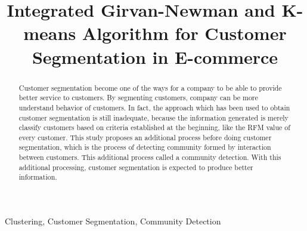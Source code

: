 \documentclass[conference]{IEEEtran}
\begin{document}
%
\title{Integrated Girvan-Newman and K-means Algorithm for Customer Segmentation in E-commerce}


\author{
\and
{}
}

\maketitle


\begin{abstract}
Customer segmentation become one of  the ways for a company to be able to provide better service to customers. By segmenting customers, company can be more understand behavior of customers. In fact, the approach which has been used to obtain customer segmentation is still inadequate, because the information generated is merely classify customers based on criteria established at the beginning, like the RFM value of every customer. This study proposes an additional process before doing customer segmentation, which is the process of detecting  community formed by interaction between customers. This additional process called a community detection. With this additional processing, customer segmentation is expected to produce better information.
\end{abstract}

\begin{IEEEkeywords}
Clustering, Customer Segmentation, Community Detection
\end{IEEEkeywords}
\end{document}
